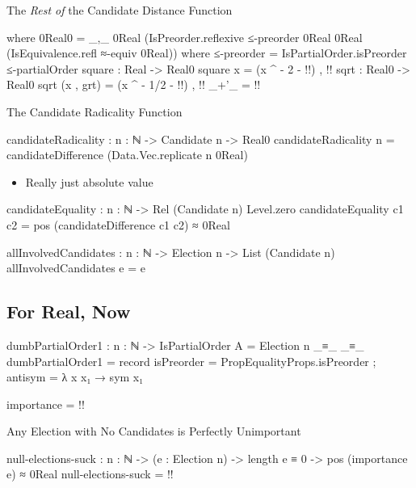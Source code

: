 \documentclass{beamer}
\begin{document}
\begin{frame}{The \emph{Rest of} the Candidate Distance Function}
\begin{code}
  where
  0Real0 =
    _,_ 0Real
        (IsPreorder.reflexive ≤-preorder
                              {0Real} {0Real}
                              (IsEquivalence.refl ≈-equiv
                                                  {0Real}))
    where ≤-preorder = IsPartialOrder.isPreorder ≤-partialOrder
  square : Real -> Real0
  square x = (x ^ {- 2 -} {!!}) , {!!}
  sqrt : Real0 -> Real0
  sqrt (x , grt) = (x ^ {- 1/2 -} {!!}) , {!!}
  _+'_ = {!!}
\end{code}
\end{frame}

\begin{frame}{The Candidate Radicality Function}
\begin{code}
candidateRadicality : {n : ℕ} -> Candidate n -> Real0
candidateRadicality {n} =
  candidateDifference (Data.Vec.replicate n 0Real)
\end{code}

\begin{itemize}
  \item Really just absolute value
\end{itemize}
\end{frame}

\begin{code}
candidateEquality : {n : ℕ} -> Rel (Candidate n) Level.zero
candidateEquality c1 c2 = pos (candidateDifference c1 c2) ≈ 0Real
\end{code}

\begin{code}
allInvolvedCandidates : {n : ℕ} -> Election {n} -> List (Candidate n)
allInvolvedCandidates e = e
\end{code}

\subsection{For Real, Now}

\begin{code}
dumbPartialOrder1 :
  {n : ℕ} ->
  IsPartialOrder {A = Election {n}} _≡_ _≡_
dumbPartialOrder1 = record
  { isPreorder = PropEqualityProps.isPreorder
  ; antisym = λ x x₁ → sym x₁
  }

importance = {!!}
\end{code}

\begin{frame}{Any Election with No Candidates is Perfectly Unimportant}
\begin{code}
null-elections-suck :
  {n : ℕ} ->
  (e : Election {n}) ->
  length e ≡ 0 ->
  pos (importance e) ≈ 0Real
null-elections-suck = {!!}
\end{code}
\end{frame}
\end{document}
